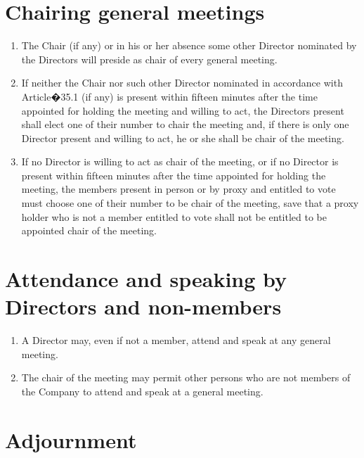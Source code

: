 \documentclass[a4paper,12pt]{article}
\begin{document}
\section{Chairing general meetings}

\begin{enumerate}
  \item The Chair (if any) or in his or her absence some other Director nominated by the Directors will preside as chair of every general meeting.
  \item If neither the Chair nor such other Director nominated in accordance with Article�35.1 (if any) is present within fifteen minutes after the time appointed for holding the meeting and willing to act, the Directors present shall elect one of their number to chair the meeting and, if there is only one Director present and willing to act, he or she shall be chair of the meeting.
  \item If no Director is willing to act as chair of the meeting, or if no Director is present within fifteen minutes after the time appointed for holding the meeting, the members present in person or by proxy and entitled to vote must choose one of their number to be chair of the meeting, save that a proxy holder who is not a member entitled to vote shall not be entitled to be appointed chair of the meeting.
\end{enumerate}

\section{Attendance and speaking by Directors and non-members}

\begin{enumerate}
  \item A Director may, even if not a member, attend and speak at any general meeting.
  \item The chair of the meeting may permit other persons who are not members of the Company to attend and speak at a general meeting.
\end{enumerate}

\section{Adjournment}
\end{document}
